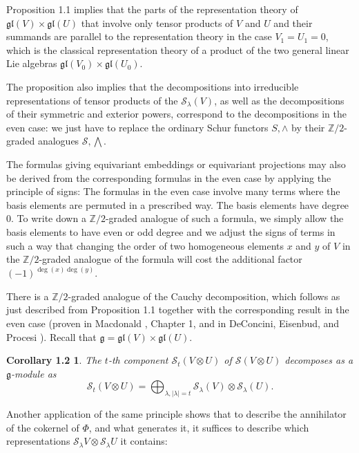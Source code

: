\documentclass{tran-l}
\theoremstyle{plain}
\newtheorem*{theorem4}{Corollary 1.2}
\theoremstyle{remark}
\theoremstyle{definition}
\newcommand{\g}{{\mathfrak g}}
\newcommand{\gl}{{\mathfrak {gl}}}
\newcommand{\myS}{{\mathcal S}}
\newcommand{\ZZ}{\mathbb {Z}}
\begin{document}
Proposition 1.1 implies that the parts of the representation theory of $\gl
(V)\times \gl (U)$ that involve only tensor products of $V$ and $U$ and their
summands are parallel to the representation theory in the case $V_{1} =U_{1}
=0$, which is the classical representation theory of a product of the two
general linear Lie algebras $\mathfrak{gl}(V_{0})\times
\mathfrak{gl}(U_{0})$.

The proposition also implies that the decompositions into irreducible
representations of tensor products of the $\myS _{\lambda }(V)$, as well as the
decompositions of their symmetric
and exterior powers,  correspond to the
decompositions in the even case: we just have
to replace the ordinary Schur functors $S, \wedge $ by their
$\ZZ /2$-graded analogues $\myS , \bigwedge $.

The
formulas giving equivariant embeddings or
equivariant projections may also be derived from the corresponding formulas
in the even case by
applying the principle of signs: The formulas in the even case involve many
terms where the basis elements are
permuted in a prescribed way. The basis elements have degree $0$. To write
down a $\ZZ /2$-graded analogue of
such a formula, we simply allow the basis elements to have even or odd degree
and we adjust the signs of terms in
such a way that changing the order of two
homogeneous elements $x$ and $y$ of
$V$  in the $\ZZ /2$-graded analogue of the formula
will cost the additional factor
$(-1)^{\deg(x)\deg(y)}$.

There is a $\ZZ /2$-graded analogue of the Cauchy decomposition,
which follows as just described from Proposition 1.1 together with
the corresponding result in the even case (proven in Macdonald \cite{Mac},
Chapter 1, and in DeConcini, Eisenbud, and Procesi \cite{DEP}).
Recall that $\g =\gl (V)\times \gl (U)$.

\begin{theorem4} The $t$-th component
$\myS _{t} (V\otimes U)$ of $\myS (V\otimes U)$
decomposes as a $\g $-module as
\begin{equation*}\myS _{t} (V\otimes U)=\bigoplus 
_{\lambda ,|\lambda |=t} \myS _{\lambda }(V)\otimes \myS _{\lambda }(U).
\end{equation*}
\end{theorem4}


Another application of the same principle shows that to
describe the annihilator of the cokernel of $\Phi $, and what
generates it, it suffices to describe which
representations $\myS _{\lambda }V\otimes \myS _{\lambda }U$ it contains:
\end{document}
